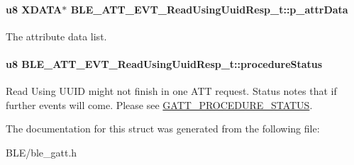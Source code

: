 \paragraph[{\texorpdfstring{p\+\_\+attr\+Data}{p_attrData}}]{\setlength{\rightskip}{0pt plus 5cm}u8 X\+D\+A\+TA$\ast$ B\+L\+E\+\_\+\+A\+T\+T\+\_\+\+E\+V\+T\+\_\+\+Read\+Using\+Uuid\+Resp\+\_\+t\+::p\+\_\+attr\+Data}\hypertarget{struct_b_l_e___a_t_t___e_v_t___read_using_uuid_resp__t_a971d83ef8d2bcfd1442c357372956a0c}{}\label{struct_b_l_e___a_t_t___e_v_t___read_using_uuid_resp__t_a971d83ef8d2bcfd1442c357372956a0c}
The attribute data list. 
\paragraph[{\texorpdfstring{procedure\+Status}{procedureStatus}}]{\setlength{\rightskip}{0pt plus 5cm}u8 B\+L\+E\+\_\+\+A\+T\+T\+\_\+\+E\+V\+T\+\_\+\+Read\+Using\+Uuid\+Resp\+\_\+t\+::procedure\+Status}\hypertarget{struct_b_l_e___a_t_t___e_v_t___read_using_uuid_resp__t_a306bf84cc04a0db1742f955c21e597a1}{}\label{struct_b_l_e___a_t_t___e_v_t___read_using_uuid_resp__t_a306bf84cc04a0db1742f955c21e597a1}
Read Using U\+U\+ID might not finish in one A\+TT request. Status notes that if further events will come. Please see \hyperlink{group___g_a_t_t___p_r_o_c_e_d_u_r_e___s_t_a_t_u_s}{G\+A\+T\+T\+\_\+\+P\+R\+O\+C\+E\+D\+U\+R\+E\+\_\+\+S\+T\+A\+T\+US}. 

The documentation for this struct was generated from the following file\+:\begin{DoxyCompactItemize}
\item 
B\+L\+E/ble\+\_\+gatt.\+h\end{DoxyCompactItemize}
